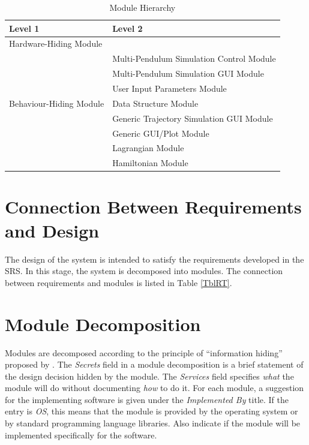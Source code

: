 \documentclass[12pt, titlepage]{article}
\newcommand{\progname}{Multi-Pendulum Simulation }
\begin{document}
\begin{table}[h!]
\centering
\begin{tabular}{p{} p{}}
\toprule
\textbf{Level 1} & \textbf{Level 2}\\
\midrule

{Hardware-Hiding Module} & ~ \\
\midrule
\multirow{7}{0.3\textwidth}{Behaviour-Hiding Module} & {\progname Control Module}\\
& \progname GUI Module\\
& User Input Parameters Module\\
& Data Structure Module\\
\midrule
\multirow{3}{0.3\textwidth}{Software Decision Module} & {Generic Trajectory Simulation GUI Module}\\
& Generic GUI/Plot Module\\
& Lagrangian Module\\
& Hamiltonian Module\\ 
\bottomrule

\end{tabular}
\caption{Module Hierarchy}
\label{TblMH}
\end{table}

\section{Connection Between Requirements and Design} \label{SecConnection}

The design of the system is intended to satisfy the requirements developed in
the SRS. In this stage, the system is decomposed into modules. The connection
between requirements and modules is listed in Table \ref{TblRT}.

\section{Module Decomposition} \label{SecMD}

Modules are decomposed according to the principle of ``information hiding''
proposed by \citet{ParnasEtAl1984}. The \emph{Secrets} field in a module
decomposition is a brief statement of the design decision hidden by the
module. The \emph{Services} field specifies \emph{what} the module will do
without documenting \emph{how} to do it. For each module, a suggestion for the
implementing software is given under the \emph{Implemented By} title. If the
entry is \emph{OS}, this means that the module is provided by the operating
system or by standard programming language libraries.  Also indicate if the
module will be implemented specifically for the software.
\end{document}
